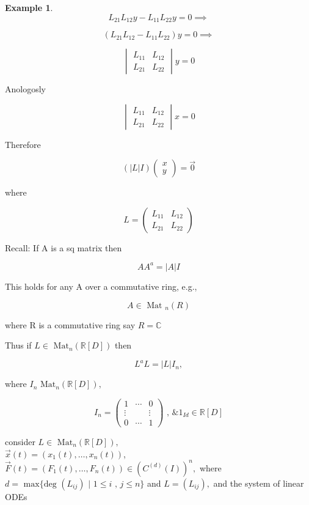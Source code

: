 \documentclass[12pt,a4paper]{article}
\theoremstyle{definition}
\newtheorem*{example}{Example}
\begin{document}
\begin{example}
  \hline

  \[ L_{21}L_{12}y - L_{11}L_{22}y = 0 \implies \]

  \[ (L_{21}L_{12} - L_{11}L_{22}) y= 0 \implies \]

  \[ 
  \begin{vmatrix}
    L_{11} & L_{12} \\
    L_{21} & L_{22}
  \end{vmatrix}
  y
  = 0
  \]

  Anologosly 


  \[ 
  \begin{vmatrix}
    L_{11} & L_{12} \\
    L_{21} & L_{22}
  \end{vmatrix}
  x
  = 0
  \]

  Therefore

  \[ ( |L|I) 
  \begin{pmatrix}
    x \\
    y
  \end{pmatrix}
  = \vec{0}
  \]

  where

  \[
  L=
  \begin{pmatrix}
    L_{11} & L_{12} \\
    L_{21} & L_{22}
  \end{pmatrix}
  \]

  Recall: If A is a sq matrix then 

  \[ AA^a = |A|I \]

  This holds for any A over a commutative ring, e.g., 

  \[ A \in \text{ Mat }_n(R) \]

  where R is a commutative ring say \( R = \mathbb{C} \)

  Thus if \( L \in \text{ Mat}_n( \mathbb{R}[D]) \) then 

  \[ L^aL = |L|I_n, \]

  where \( I_n \text{ Mat}_n( \mathbb{R}[D]),  \)

  \[ 
  I_n = 
  \begin{pmatrix}
    1 & \cdots & 0 \\
    \vdots &  & \vdots \\
    0 & \cdots & 1
  \end{pmatrix}
  \text{ , \& }
  1_{Id} \in \mathbb{R}[D]
  \]

  consider \( L \in \text{ Mat}_n( \mathbb{R}[D]), \) \\

  \( \vec{x}(t) = (x_1(t), \dots , x_n(t)) \), \( \vec{F}(t) = (F_1(t),
  \dots, F_n(t)) \in (C^{(d)}(I))^n,\) where \( d= \text{ max} \{ \text{
  deg }(L_{ij}) \text{ | } 1 \leq i \text{ , } j \leq n \} \) and \( L =
  (L_{ij}),  \) and the system of linear ODEs


\end{example}
\end{document}
